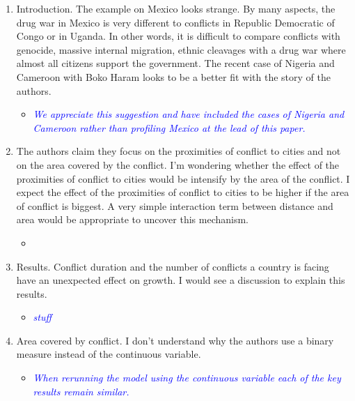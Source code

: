 \begin{enumerate}

\item Introduction. The example on Mexico looks strange. By many aspects, the drug war in Mexico is very different to conflicts in Republic Democratic of Congo or in Uganda. In other words, it is difficult to compare conflicts with genocide, massive internal migration, ethnic cleavages with a drug war where almost all citizens support the government. The recent case of Nigeria and Cameroon with Boko Haram looks to be a better fit with the story of the authors.

\begin{itemize}
\item \textcolor{blue}{\emph{
	We appreciate this suggestion and have included the cases of Nigeria and Cameroon rather than profiling Mexico at the lead of this paper. 
}}
\end{itemize}

\item The authors claim they focus on the proximities of conflict to cities and not on the area covered by the conflict. I’m wondering whether the effect of the proximities of conflict to cities would be intensify by the area of the conflict. I expect the effect of the proximities of conflict to cities to be higher if the area of conflict is biggest. A very simple interaction term between distance and area would be appropriate to uncover this mechanism.

\begin{itemize}
\item \textcolor{blue}{\emph{
}}
\end{itemize}

\item Results. Conflict duration and the number of conflicts a country is facing have an unexpected effect on growth. I would see a discussion to explain this results.

\begin{itemize}
\item \textcolor{blue}{\emph{stuff}}
\end{itemize}

\item Area covered by conflict. I don’t understand why the authors use a binary measure instead of the continuous variable.

\begin{itemize}
\item \textcolor{blue}{\emph{
	When rerunning the model using the continuous variable each of the key results remain similar.
}}
\end{itemize}


\end{enumerate}
